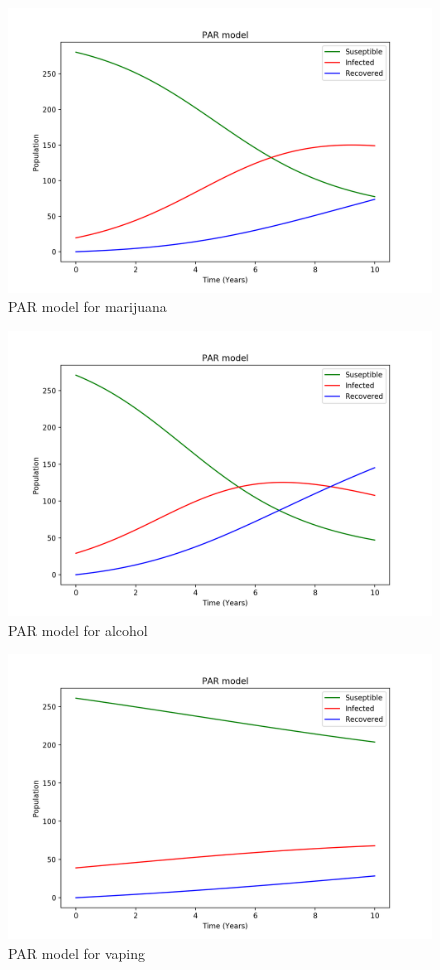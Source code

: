 \documentclass[12pt,letterpaper]{article}
\begin{document}
\begin{figure}[H]
  \centering
  \includegraphics[width=.8\linewidth]{marijuana}
  \caption{PAR model for marijuana}
  \label{fig:marijuana}
\end{figure}

\begin{figure}[H]
  \centering
  \includegraphics[width=.8\linewidth]{alcohol}
  \caption{PAR model for alcohol}
  \label{fig:alcohol}
\end{figure}

\begin{figure}[H]
  \centering
  \includegraphics[width=.8\linewidth]{vape}
  \caption{PAR model for vaping}
  \label{fig:vape}
\end{figure}
\end{document}
